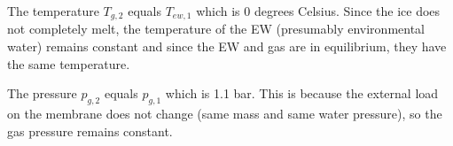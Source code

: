 The temperature \( T_{g,2} \) equals \( T_{ew,1} \) which is 0 degrees Celsius. Since the ice does not completely melt, the temperature of the EW (presumably environmental water) remains constant and since the EW and gas are in equilibrium, they have the same temperature.

The pressure \( p_{g,2} \) equals \( p_{g,1} \) which is 1.1 bar. This is because the external load on the membrane does not change (same mass and same water pressure), so the gas pressure remains constant.